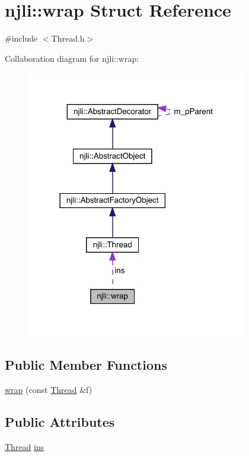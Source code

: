\hypertarget{structnjli_1_1wrap}{}\section{njli\+:\+:wrap Struct Reference}
\label{structnjli_1_1wrap}


{\ttfamily \#include $<$Thread.\+h$>$}



Collaboration diagram for njli\+:\+:wrap\+:\nopagebreak
\begin{figure}[H]
\begin{center}
\leavevmode
\includegraphics[width=273pt]{structnjli_1_1wrap__coll__graph}
\end{center}
\end{figure}
\subsection*{Public Member Functions}
\begin{DoxyCompactItemize}
\item 
\mbox{\hyperlink{structnjli_1_1wrap_a2d6762e15815bb762e1da6ac8c4299c2}{wrap}} (const \mbox{\hyperlink{classnjli_1_1_thread}{Thread}} \&f)
\end{DoxyCompactItemize}
\subsection*{Public Attributes}
\begin{DoxyCompactItemize}
\item 
\mbox{\hyperlink{classnjli_1_1_thread}{Thread}} \mbox{\hyperlink{structnjli_1_1wrap_a642a7dd725d24a5c0a540c8d6158bbb7}{ins}}
\end{DoxyCompactItemize}



